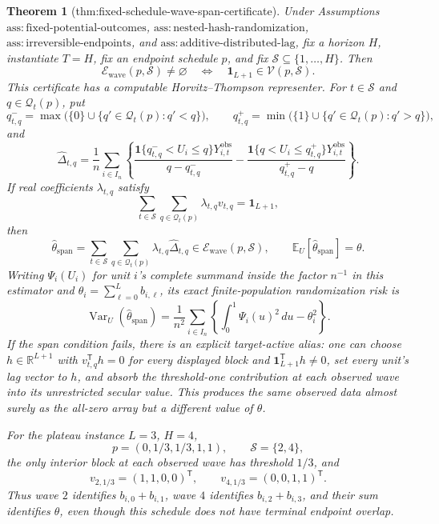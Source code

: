 \documentclass{article}
\newtheorem{theorem}{Theorem}
\begin{document}
\begin{theorem}[thm:fixed-schedule-wave-span-certificate]\label{thm:fixed-schedule-wave-span-certificate}
Under Assumptions \(\mathrm{ass:fixed\text{-}potential\text{-}outcomes}\), \(\mathrm{ass:nested\text{-}hash\text{-}randomization}\), \(\mathrm{ass:irreversible\text{-}endpoints}\), and \(\mathrm{ass:additive\text{-}distributed\text{-}lag}\), fix a horizon \(H\), instantiate \(T=H\), fix an endpoint schedule \(p\), and fix \(\mathcal S\subseteq\{1,\ldots,H\}\).  Then
\[
 \mathcal E_{\mathrm{wave}}(p,\mathcal S)\ne\varnothing
 \quad\Longleftrightarrow\quad
 \mathbf 1_{L+1}\in\mathcal V(p,\mathcal S).
\]
This certificate has a computable Horvitz--Thompson representer.  For \(t\in\mathcal S\) and \(q\in\mathcal Q_t(p)\), put
\[
 q^-_{t,q}=\max\bigl(\{0\}\cup\{q'\in\mathcal Q_t(p):q'<q\}\bigr),
 \qquad
 q^+_{t,q}=\min\bigl(\{1\}\cup\{q'\in\mathcal Q_t(p):q'>q\}\bigr),
\]
and
\[
 \widehat\Delta_{t,q}
 =\frac1n\sum_{i\in I_n}\left\{
 \frac{\mathbf 1\{q^-_{t,q}<U_i\le q\}Y^{\mathrm{obs}}_{i,t}}
      {q-q^-_{t,q}}
 -\frac{\mathbf 1\{q<U_i\le q^+_{t,q}\}Y^{\mathrm{obs}}_{i,t}}
      {q^+_{t,q}-q}
 \right\}.
\]
If real coefficients \(\lambda_{t,q}\) satisfy
\[
 \sum_{t\in\mathcal S}\sum_{q\in\mathcal Q_t(p)}
 \lambda_{t,q}v_{t,q}=\mathbf 1_{L+1},
\]
then
\[
 \widehat\theta_{\mathrm{span}}
 =\sum_{t\in\mathcal S}\sum_{q\in\mathcal Q_t(p)}
   \lambda_{t,q}\widehat\Delta_{t,q}
 \in\mathcal E_{\mathrm{wave}}(p,\mathcal S),
 \qquad
 \mathbb E_U[\widehat\theta_{\mathrm{span}}]=\theta.
\]
Writing \(\Psi_i(U_i)\) for unit \(i\)'s complete summand inside the factor \(n^{-1}\) in this estimator and \(\theta_i=\sum_{\ell=0}^{L}b_{i,\ell}\), its exact finite-population randomization risk is
\[
 \operatorname{Var}_U(\widehat\theta_{\mathrm{span}})
 =\frac1{n^2}\sum_{i\in I_n}
 \left\{\int_0^1\Psi_i(u)^2\,du-\theta_i^2\right\}.
\]
If the span condition fails, there is an explicit target-active alias: one can choose \(h\in\mathbb R^{L+1}\) with \(v_{t,q}^{\mathsf T}h=0\) for every displayed block and \(\mathbf 1_{L+1}^{\mathsf T}h\ne0\), set every unit's lag vector to \(h\), and absorb the threshold-one contribution at each observed wave into its unrestricted secular value.  This produces the same observed data almost surely as the all-zero array but a different value of \(\theta\).

For the plateau instance \(L=3\), \(H=4\),
\[
 p=(0,1/3,1/3,1,1),
 \qquad \mathcal S=\{2,4\},
\]
the only interior block at each observed wave has threshold \(1/3\), and
\[
 v_{2,1/3}=(1,1,0,0)^{\mathsf T},
 \qquad
 v_{4,1/3}=(0,0,1,1)^{\mathsf T}.
\]
Thus wave \(2\) identifies \(b_{i,0}+b_{i,1}\), wave \(4\) identifies \(b_{i,2}+b_{i,3}\), and their sum identifies \(\theta\), even though this schedule does not have terminal endpoint overlap.
\end{theorem}
\end{document}
